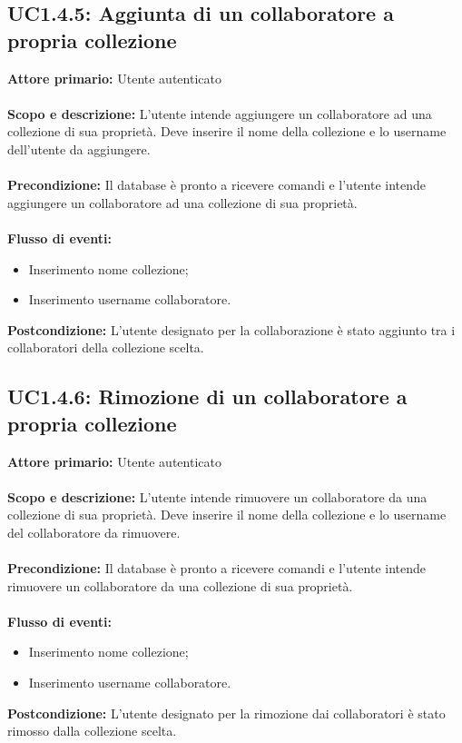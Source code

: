 \documentclass{scalatekids-article}
\begin{document}
\subsection{UC1.4.5: Aggiunta di un collaboratore a propria collezione}
\textbf{Attore primario:} Utente autenticato\\ \\
\textbf{Scopo e descrizione:} L'utente intende aggiungere un collaboratore ad una collezione di sua proprietà. Deve inserire il nome della collezione e lo username dell'utente da aggiungere.\\ \\
\textbf{Precondizione:} Il database è pronto a ricevere comandi e l'utente intende aggiungere un collaboratore ad una collezione di sua proprietà.\\ \\
\textbf{Flusso di eventi:}
\begin{itemize}
\item Inserimento nome collezione;
\item Inserimento username collaboratore.
\end{itemize}
\textbf{Postcondizione:} L'utente designato per la collaborazione è stato aggiunto tra i collaboratori della collezione scelta.
\subsection{UC1.4.6: Rimozione di un collaboratore a propria collezione}
\textbf{Attore primario:} Utente autenticato\\ \\
\textbf{Scopo e descrizione:} L'utente intende rimuovere un collaboratore da una collezione di sua proprietà. Deve inserire il nome della collezione e lo username del collaboratore da rimuovere.\\ \\
\textbf{Precondizione:} Il database è pronto a ricevere comandi e l'utente intende rimuovere un collaboratore da una collezione di sua proprietà.\\ \\
\textbf{Flusso di eventi:}
\begin{itemize}
\item Inserimento nome collezione;
\item Inserimento username collaboratore.
\end{itemize}
\textbf{Postcondizione:} L'utente designato per la rimozione dai collaboratori è stato rimosso dalla collezione scelta.
\end{document}
